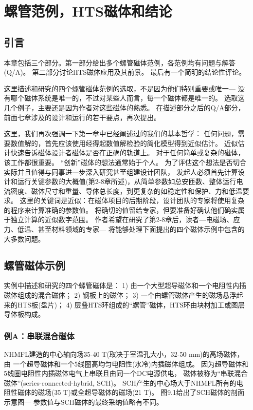 \chapter{螺管范例，HTS磁体和结论}
\section{引言}
本章包括三个部分。第一部分给出多个螺管磁体范例，各范例均有问题与解答(Q/A)。
第二部分讨论HTS磁体应用及其前景。
最后有一个简明的结论性评论。

这里描述和研究的四个螺管磁体范例的选取，不是因为他们特别重要或唯一---
没有哪个磁体系统是唯一的，不过对某些人而言，每一个磁体都是唯一的。
选取这几个例子，主要还是因为作者对这些磁体的熟悉。
在描述部分之后的Q/A部分，前面七章涉及的设计和运行的若干要点，再次提出。

这里，我们再次强调一下第一章中已经阐述过的我们的基本哲学：
任何问题，需要数值解的，首先应该使用经得起数值解检验的简化模型得到近似估计。
近似估计快速告诉磁体设计者磁体是否在正确的轨道上。
对于任何简单或复杂的磁体，该工作都很重要。
 “创新”磁体的想法通常始于个人。
 为了评估这个想法是否切合实际并且值得与同事进一步深入研究甚至组建设计团队，
 发起人必须首先计算设计和运行关键参数的大概值(第2-8章所述)，从简单参数如总安匝数、整体运行电流密度、磁体尺寸和重量、导体总长度，到更复杂的如稳定性和保护、力和低温要求。
 这里的关键词是近似：在磁体项目的后期阶段，设计团队的专家将使用复杂的程序来计算准确的参数值。
 将确切的值留给专家，但要准备好确认他们确实属于独立计算的近似数字范围。
 作者希望在研究了第2-8章后，读者---电磁场、应力、低温、甚至材料领域的专家---
 将能够处理下面提出的四个磁体示例中包含的大多数问题。


\section{螺管磁体示例}
实例中描述和研究的四个螺管磁体是：
1)  由一个大型超导磁体和一个电阻性内插磁体组成的混合磁体；
2) 钢板上的磁体；
3) 一个由螺管磁体产生的磁场悬浮起来的HTS板(盘片)；
4) 层叠HTS环组成的“螺管”磁体，HTS环由块材加工或图层导体板构成。 


\subsection{例A：串联混合磁体}
NHMFL建造的中心轴向场35-40 T(取决于室温孔大小，32-50 mm)的高场磁体，由
一个超导磁体和一个5线圈高均匀电阻性(水冷)内插磁体组成。
因为超导磁体和5线圈电阻性内插磁体电气上串联且由同一个DC电源供电，
磁体被称为“串联混合磁体”(series-connected-hybrid, SCH)。
SCH产生的中心场大于NHMFL所有的电阻性磁体的磁场(35 T)或全超导磁体的磁场(21 T)。
图9.1给出了SCH磁体的剖面示意图---
参数值与SCH磁体的最终采纳值略有不同。

